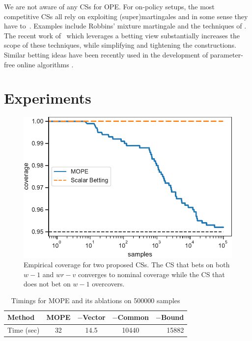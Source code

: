 We are not aware of any CSs for OPE.  For on-policy setups, the most
competitive CSs all rely on exploiting (super)martingales and in some sense
they have to~\cite{ramdas2020admissible}.  Examples include Robbins' mixture
martingale \cite{robbins_statistical_1970} and the techniques of
\cite{howard_uniform_2019}. The recent work
of~\cite{waudby-smith_variance-adaptive_2020} which 
leverages a betting view substantially
increases the scope of these techniques, while
simplifying and tightening the constructions. Similar betting 
ideas have been recently used in the development of 
parameter-free online algorithms \cite{OrabonaP16}.

\section{Experiments}

\begin{figure}
    \centering
    \includegraphics[width=0.75\linewidth]{coverage}
    \caption{Empirical coverage for two proposed CSs. The CS that bets on 
    both $w-1$ and $wr-v$ converges to nominal coverage while the CS
    that does not bet on $w-1$ overcovers.}
    \label{fig:coverage}
\end{figure}

\begin{table}
\caption{Timings for MOPE and its ablations on 500000 samples}
\label{tab:timings}
\centering
\begin{small}
\begin{sc}
\begin{tabular}{lcccr}
\toprule
Method & MOPE & $-$Vector & $-$Common & $-$Bound \\
\midrule
Time (sec)& 32     & 14.5  & 10440 & 15882 \\
\bottomrule
\end{tabular}
\end{sc}
\end{small}
\end{table}

